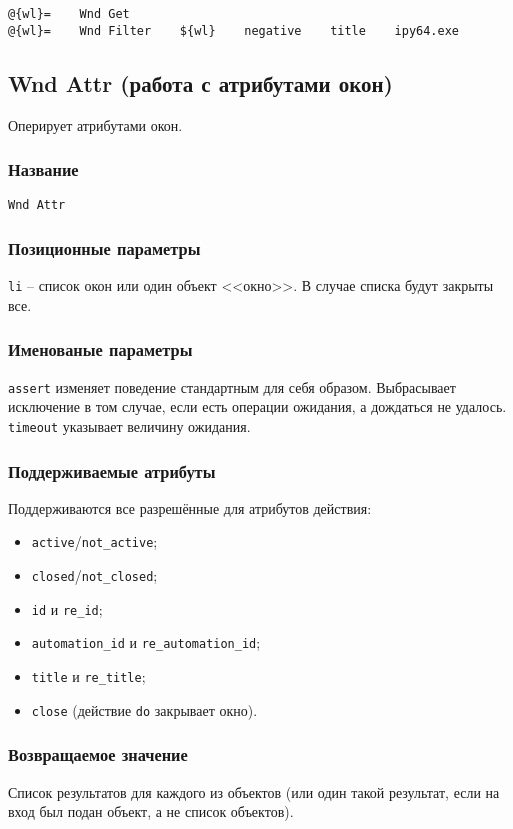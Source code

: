 \documentclass[11pt]{book} %
\begin{document}
\begin{verbatim}
@{wl}=    Wnd Get
@{wl}=    Wnd Filter    ${wl}    negative    title    ipy64.exe
\end{verbatim}


\subsection{Wnd Attr (работа с атрибутами окон)}
Оперирует атрибутами окон.


\subsubsection*{Название} 
\verb"Wnd Attr"

\subsubsection*{Позиционные параметры} 
\verb"li" -- список окон или один объект <<окно>>. В случае списка будут закрыты все.

\subsubsection*{Именованые параметры} 
\verb"assert" изменяет поведение стандартным для себя образом. Выбрасывает исключение в том случае, если есть операции ожидания, а дождаться не удалось.
\verb"timeout" указывает величину ожидания.

\subsubsection*{Поддерживаемые атрибуты} 

Поддерживаются все разрешённые для атрибутов действия:

\begin{itemize}
	\item \verb"active"/\verb"not_active";
	\item \verb"closed"/\verb"not_closed";
	\item \verb"id" и \verb"re_id";
	\item \verb"automation_id" и \verb"re_automation_id";
	\item \verb"title" и \verb"re_title";
	\item \verb"close" (действие \verb"do" закрывает окно).
\end{itemize}

\subsubsection*{Возвращаемое значение} 
Список результатов для каждого из объектов (или один такой результат, если на вход был подан объект, а не список объектов).
\end{document}
